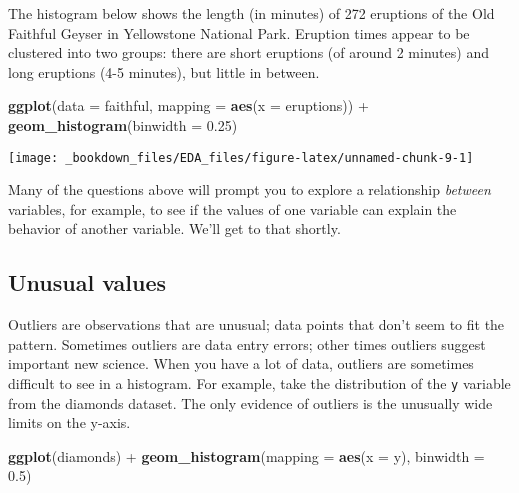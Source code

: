 \documentclass[]{book}
\newenvironment{Shaded}{\begin{snugshade}}{\end{snugshade}}
\newcommand{\KeywordTok}[1]{\textcolor[rgb]{0.13,0.29,0.53}{\textbf{{#1}}}}
\newcommand{\DataTypeTok}[1]{\textcolor[rgb]{0.13,0.29,0.53}{{#1}}}
\newcommand{\FloatTok}[1]{\textcolor[rgb]{0.00,0.00,0.81}{{#1}}}
\newcommand{\StringTok}[1]{\textcolor[rgb]{0.31,0.60,0.02}{{#1}}}
\newcommand{\NormalTok}[1]{{#1}}
\begin{document}
The histogram below shows the length (in minutes) of 272 eruptions of
the Old Faithful Geyser in Yellowstone National Park. Eruption times
appear to be clustered into two groups: there are short eruptions (of
around 2 minutes) and long eruptions (4-5 minutes), but little in
between.

\begin{Shaded}
\begin{Highlighting}[]
\KeywordTok{ggplot}\NormalTok{(}\DataTypeTok{data =} \NormalTok{faithful, }\DataTypeTok{mapping =} \KeywordTok{aes}\NormalTok{(}\DataTypeTok{x =} \NormalTok{eruptions)) +}\StringTok{ }
\StringTok{  }\KeywordTok{geom_histogram}\NormalTok{(}\DataTypeTok{binwidth =} \FloatTok{0.25}\NormalTok{)}
\end{Highlighting}
\end{Shaded}

\begin{center}\texttt{[image: \_bookdown\_files/EDA\_files/figure-latex/unnamed-chunk-9-1]} \end{center}

Many of the questions above will prompt you to explore a relationship
\emph{between} variables, for example, to see if the values of one
variable can explain the behavior of another variable. We'll get to that
shortly.

\subsection{Unusual values}\label{unusual-values}

Outliers are observations that are unusual; data points that don't seem
to fit the pattern. Sometimes outliers are data entry errors; other
times outliers suggest important new science. When you have a lot of
data, outliers are sometimes difficult to see in a histogram. For
example, take the distribution of the \texttt{y} variable from the
diamonds dataset. The only evidence of outliers is the unusually wide
limits on the y-axis.

\begin{Shaded}
\begin{Highlighting}[]
\KeywordTok{ggplot}\NormalTok{(diamonds) +}\StringTok{ }
\StringTok{  }\KeywordTok{geom_histogram}\NormalTok{(}\DataTypeTok{mapping =} \KeywordTok{aes}\NormalTok{(}\DataTypeTok{x =} \NormalTok{y), }\DataTypeTok{binwidth =} \FloatTok{0.5}\NormalTok{)}
\end{Highlighting}
\end{Shaded}
\end{document}
